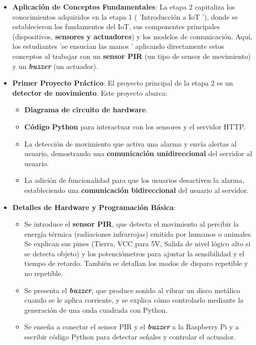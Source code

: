 \documentclass{report}
\begin{document}
\begin{itemize}
    \item \textbf{Aplicación de Conceptos Fundamentales}: La etapa 2 capitaliza los conocimientos adquiridos en la etapa 1 ( 'Introducción a IoT '), 
    donde se establecieron los fundamentos del IoT, sus componentes principales (dispositivos, \textbf{sensores y actuadores}) y los modelos de comunicación. 
    Aquí, los estudiantes  'se ensucian las manos ' aplicando directamente estos conceptos al trabajar con un \textbf{sensor PIR} (un tipo de sensor de 
    movimiento) y un \textbf{\textit{buzzer}} (un actuador).
    
    \item \textbf{Primer Proyecto Práctico}: El proyecto principal de la etapa 2 es un \textbf{detector de movimiento}. Este proyecto abarca:
    \begin{itemize}
        \item \textbf{Diagrama de circuito de hardware}.
        \item \textbf{Código Python} para interactuar con los sensores y el servidor HTTP.
        \item La detección de movimiento que activa una alarma y envía alertas al usuario, demostrando una \textbf{comunicación unidireccional} del servidor 
        al usuario.
        \item La adición de funcionalidad para que los usuarios desactiven la alarma, estableciendo una \textbf{comunicación bidireccional} del usuario al 
        servidor.
    \end{itemize}
    
    \item \textbf{Detalles de Hardware y Programación Básica}:
    \begin{itemize}
        \item Se introduce el \textbf{sensor PIR}, que detecta el movimiento al percibir la energía térmica (radiaciones infrarrojas) emitida por humanos 
        o animales. Se explican sus pines (Tierra, VCC para 5V, Salida de nivel lógico alto si se detecta objeto) y los potenciómetros para ajustar la 
        sensibilidad y el tiempo de retardo. También se detallan los modos de disparo repetible y no repetible.
        \item Se presenta el \textbf{\textit{buzzer}}, que produce sonido al vibrar un disco metálico cuando se le aplica corriente, y se explica cómo 
        controlarlo mediante la generación de una onda cuadrada con Python.
        \item Se enseña a conectar el sensor PIR y el \textbf{\textit{buzzer}} a la Raspberry Pi y a escribir código Python para detectar señales y 
        controlar el actuador.
    \end{itemize}
    

\end{itemize}
\end{document}
